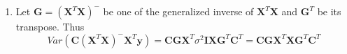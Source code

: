 \documentclass{article}
\begin{document}
\begin{enumerate}[leftmargin = 0 em, label = \arabic*., font = \bfseries]
\begin{enumerate}
		\item 
		Let $\bm G = (\bm X^T \bm X)^-$ be one of the generalized inverse of $\bm X^T \bm X$ and $\bm G^T$ be its transpose. Thus
		\[Var(\bm C (\bm X^T \bm X)^- \bm X^T \bm y) = \bm C \bm G \bm X^T \sigma^2 \bm I \bm X \bm G^T \bm C^T = \bm C \bm G \bm X^T\bm X \bm G^T \bm C^T\]
		

	\end{enumerate}
	

	

	
	





 	\end{enumerate}


	
	
	
	
\end{document}
